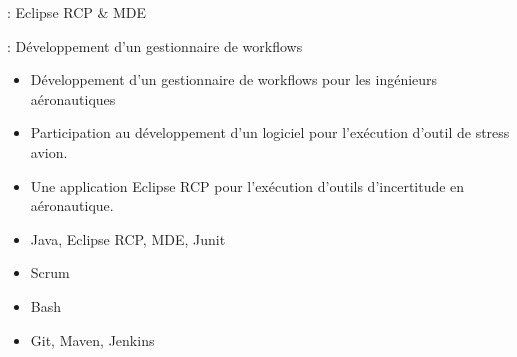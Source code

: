 

 : Eclipse RCP \& MDE

 : Développement d’un gestionnaire de workflows

\bigskip


\begin{itemize}
\item Développement d'un gestionnaire de workflows pour les ingénieurs aéronautiques
\item Participation au développement d'un logiciel pour l'exécution d'outil de stress avion.
\end{itemize} 


\begin{itemize}
\item Une application Eclipse RCP pour l'exécution d'outils d'incertitude en aéronautique. 
\end{itemize} 


\begin{itemize}
\item Java, Eclipse RCP, MDE, Junit
\item Scrum
\item Bash
\item Git, Maven, Jenkins
\end{itemize} 